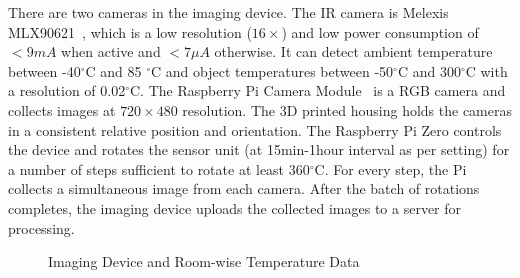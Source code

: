 There are two cameras in the imaging device. The IR camera is Melexis MLX90621~\cite{MLX}, which is a low resolution ($16\times$) and low power consumption of $<9mA$ when active and $<7\mu A$ otherwise. It can detect ambient temperature between  -40$^{\circ}$C  and 85 $^{\circ}$C  and object temperatures between  -50$^{\circ}$C  and  300$^{\circ}$C  with a resolution of  0.02$^{\circ}$C. The Raspberry Pi Camera Module~\cite{picam} is a RGB camera and collects images at $720\times480$ resolution. The 3D printed housing holds the cameras in a consistent relative position and orientation. The Raspberry Pi Zero controls the device and rotates the sensor unit (at 15min-1hour interval as per setting) for a number of steps sufficient to rotate at
least  360$^{\circ}$C. For every step, the Pi collects a simultaneous image from each camera. After the batch of rotations completes, the imaging device uploads the collected images to a server for processing.




	
\begin{figure}[h]
 \centering
       \centering
    \caption{Imaging Device and Room-wise Temperature Data}
\end{figure}

